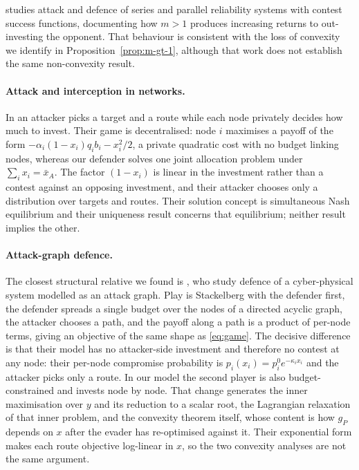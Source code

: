 \documentclass[10pt,a4paper,twoside]{article}
\theoremstyle{plain}
\theoremstyle{definition}
\newcommand{\XA}{\bar{x}_A}
\begin{document}
\citet{hausken2008} studies attack and defence of series and parallel
reliability systems with contest success functions, documenting how $m>1$
produces increasing returns to out-investing the opponent. That behaviour is
consistent with the loss of convexity we identify in
Proposition~\ref{prop:m-gt-1}, although that work does not establish the same
non-convexity result.

\paragraph{Attack and interception in networks.}
In \citet{bloch2023} an attacker picks a target and a route while each node
privately decides how much to invest. Their game is decentralised: node $i$
maximises a payoff of the form $-\alpha_i(1-x_i)q_ib_i-x_i^2/2$, a private
quadratic cost with no budget linking nodes, whereas our defender solves one
joint allocation problem under $\sum_i x_i=\XA$. The factor $(1-x_i)$ is
linear in the investment rather than a contest against an opposing
investment, and their attacker chooses only a distribution over targets and
routes. Their solution concept is simultaneous Nash equilibrium and their
uniqueness result concerns that equilibrium; neither result implies the
other.

\paragraph{Attack-graph defence.}
The closest structural relative we found is \citet{oruganti2023}, who study
defence of a cyber-physical system modelled as an attack graph. Play is
Stackelberg with the defender first, the defender spreads a single budget
over the nodes of a directed acyclic graph, the attacker chooses a path, and
the payoff along a path is a product of per-node terms, giving an objective
of the same shape as \eqref{eq:game}. The decisive difference is that their
model has no attacker-side investment and therefore no contest at any node:
their per-node compromise probability is $p_i(x_i)=p_i^{0}e^{-\kappa_i x_i}$
and the attacker picks only a route. In our model the second player is also
budget-constrained and invests node by node. That change generates the inner
maximisation over $y$ and its reduction to a scalar root, the Lagrangian
relaxation of that inner problem, and the convexity theorem itself, whose
content is how $g_P$ depends on $x$ after the evader has re-optimised against
it. Their exponential form makes each route objective log-linear in $x$, so
the two convexity analyses are not the same argument.
\end{document}
